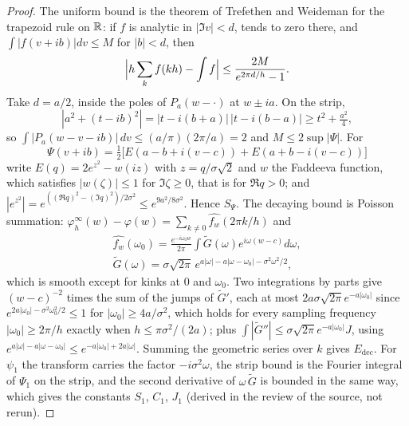 \begin{proof}
The uniform bound is the theorem of Trefethen and Weideman \cite{TW14} for the trapezoid rule on $\mathbb{R}$: if $f$ is analytic in $|\Im v|<d$, tends to zero there, and $\int|f(v+ib)|dv\le M$ for $|b|<d$, then
\[
\Bigl|h\sum_kf(kh)-\int f\Bigr|\le\frac{2M}{e^{2\pi d/h}-1}.
\]
Take $d=a/2$, inside the poles of $P_a(w-\cdot)$ at $w\pm ia$. On the strip,
\[
|a^2+(t-ib)^2|=|t-i(b+a)|\,|t-i(b-a)|\ge t^2+\tfrac{a^2}4,
\]
so $\int|P_a(w-v-ib)|\,dv\le(a/\pi)(2\pi/a)=2$ and $M\le2\sup|\Psi|$. For
\[
\Psi(v+ib)=\tfrac12\bigl[E(a-b+i(v-c))+E(a+b-i(v-c))\bigr]
\]
write $E(q)=2e^{z^2}-w(iz)$ with $z=q/\sigma\sqrt2$ and $w$ the Faddeeva function, which satisfies $|w(\zeta)|\le1$ for $\Im\zeta\ge0$, that is for $\Re q>0$; and $|e^{z^2}|=e^{((\Re q)^2-(\Im q)^2)/2\sigma^2}\le e^{9a^2/8\sigma^2}$. Hence $S_\Psi$. The decaying bound is Poisson summation: $\varphi_h^\infty(w)-\varphi(w)=\sum_{k\ne0}\widehat{f_w}(2\pi k/h)$ and
\begin{gather*}
\widehat{f_w}(\omega_0)=\frac{e^{-i\omega_0w}}{2\pi}\int\widetilde G(\omega)e^{i\omega(w-c)}d\omega,\\
\widetilde G(\omega)=\sigma\sqrt{2\pi}\,e^{a|\omega|-a|\omega-\omega_0|-\sigma^2\omega^2/2},
\end{gather*}
which is smooth except for kinks at $0$ and $\omega_0$. Two integrations by parts give $(w-c)^{-2}$ times the sum of the jumps of $\widetilde G'$, each at most $2a\sigma\sqrt{2\pi}e^{-a|\omega_0|}$ since $e^{2a|\omega_0|-\sigma^2\omega_0^2/2}\le1$ for $|\omega_0|\ge4a/\sigma^2$, which holds for every sampling frequency $|\omega_0|\ge2\pi/h$ exactly when $h\le\pi\sigma^2/(2a)$; plus $\int|\widetilde G''|\le\sigma\sqrt{2\pi}e^{-a|\omega_0|}J$, using $e^{a|\omega|-a|\omega-\omega_0|}\le e^{-a|\omega_0|+2a|\omega|}$. Summing the geometric series over $k$ gives $E_{\mathrm{dec}}$. For $\psi_1$ the transform carries the factor $-i\sigma^2\omega$, the strip bound is the Fourier integral of $\Psi_1$ on the strip, and the second derivative of $\omega\,\widetilde G$ is bounded in the same way, which gives the constants $S_1$, $C_1$, $J_1$ (derived in the review of the source, not rerun).
\end{proof}

